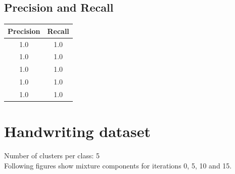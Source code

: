 \documentclass[11pt,a4paper]{article}
\begin{document}
\subsection{Precision and Recall}

\begin{center}
\begin{tabular}{|c|c|}
\hline
\textbf{Precision} & \textbf{Recall} \\ \hline
1.0 & 1.0 \\ \hline
1.0 & 1.0 \\ \hline
1.0 & 1.0 \\ \hline
1.0 & 1.0 \\ \hline
1.0 & 1.0 \\ \hline
\end{tabular}

\end{center}

\section{Handwriting dataset}
Number of clusters per class: 5
\\Following figures show mixture components for iterations 0, 5, 10 and 15. 
\end{document}
